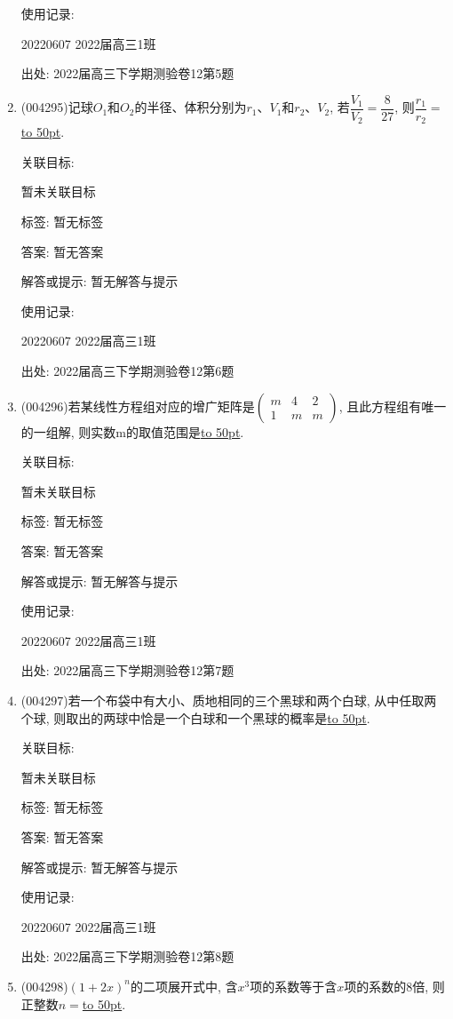 \documentclass[10pt,a4paper]{article}
\newcommand{\blank}[1]{\underline{\hbox to #1pt{}}}
\begin{document}
\begin{enumerate}[1.]
使用记录:

20220607	2022届高三1班	


出处: 2022届高三下学期测验卷12第5题
\item { (004295)}记球$O_1$和$O_2$的半径、体积分别为$r_1$、$V_1$和$r_2$、$V_2$, 若$\dfrac{V_1}{V_2}=\dfrac 8{27}$, 则$\dfrac{r_1}{r_2}=$\blank{50}.


关联目标:

暂未关联目标



标签: 暂无标签

答案: 暂无答案

解答或提示: 暂无解答与提示

使用记录:

20220607	2022届高三1班	


出处: 2022届高三下学期测验卷12第6题
\item { (004296)}若某线性方程组对应的增广矩阵是$\begin{pmatrix}   m & 4 & 2  \\1 & m & m  \end{pmatrix}$, 且此方程组有唯一的一组解, 则实数m的取值范围是\blank{50}.


关联目标:

暂未关联目标



标签: 暂无标签

答案: 暂无答案

解答或提示: 暂无解答与提示

使用记录:

20220607	2022届高三1班	


出处: 2022届高三下学期测验卷12第7题
\item { (004297)}若一个布袋中有大小、质地相同的三个黑球和两个白球, 从中任取两个球, 则取出的两球中恰是一个白球和一个黑球的概率是\blank{50}.


关联目标:

暂未关联目标



标签: 暂无标签

答案: 暂无答案

解答或提示: 暂无解答与提示

使用记录:

20220607	2022届高三1班	


出处: 2022届高三下学期测验卷12第8题
\item { (004298)}$(1+2x)^n$的二项展开式中, 含$x^3$项的系数等于含$x$项的系数的$8$倍, 则正整数$n=$\blank{50}.



\end{enumerate}
\end{document}
